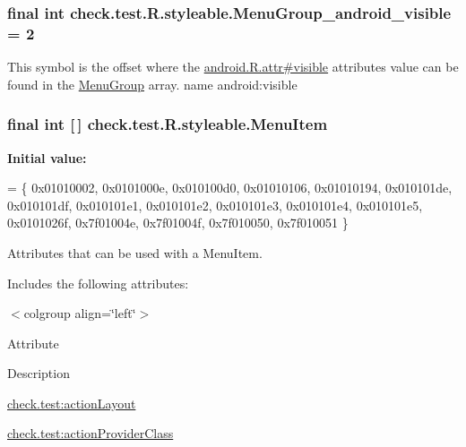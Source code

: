 \subsubsection[{Menu\+Group\+\_\+android\+\_\+visible}]{\setlength{\rightskip}{0pt plus 5cm}final int check.\+test.\+R.\+styleable.\+Menu\+Group\+\_\+android\+\_\+visible = 2\hspace{0.3cm}{\ttfamily [static]}}\label{classcheck_1_1test_1_1_r_1_1styleable_a329149f9ef5c82c8f8ddfde35c9d9e05}
This symbol is the offset where the \hyperlink{}{android.\+R.\+attr\#visible} attribute\textquotesingle{}s value can be found in the \hyperlink{classcheck_1_1test_1_1_r_1_1styleable_a95a67e0fb4cd8754aea3728538c936cf}{Menu\+Group} array.  name android\+:visible \hypertarget{classcheck_1_1test_1_1_r_1_1styleable_af26376072eab01d1b4197e48992dc936}{}
\subsubsection[{Menu\+Item}]{\setlength{\rightskip}{0pt plus 5cm}final int \mbox{[}$\,$\mbox{]} check.\+test.\+R.\+styleable.\+Menu\+Item\hspace{0.3cm}{\ttfamily [static]}}\label{classcheck_1_1test_1_1_r_1_1styleable_af26376072eab01d1b4197e48992dc936}
{\bfseries Initial value\+:}
\begin{DoxyCode}
= \{
            0x01010002, 0x0101000e, 0x010100d0, 0x01010106,
            0x01010194, 0x010101de, 0x010101df, 0x010101e1,
            0x010101e2, 0x010101e3, 0x010101e4, 0x010101e5,
            0x0101026f, 0x7f01004e, 0x7f01004f, 0x7f010050,
            0x7f010051
        \}
\end{DoxyCode}
Attributes that can be used with a Menu\+Item. 

Includes the following attributes\+:

\begin{TabularC}{0}
\hline
\end{TabularC}
$<$colgroup align=\char`\"{}left\char`\"{}$>$ 

Attribute

Description 

{\ttfamily \hyperlink{classcheck_1_1test_1_1_r_1_1styleable_a1e6d157f94282edbc7543ea239b101bb}{check.\+test\+:action\+Layout}}

{\ttfamily \hyperlink{classcheck_1_1test_1_1_r_1_1styleable_a1de7e291dacc4f22974c8384b8f76ee4}{check.\+test\+:action\+Provider\+Class}}


